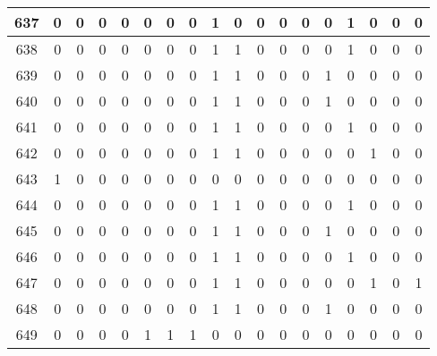 \begin{tabular}{|c|c|c|c|c|c|c|c|c|c|c|c|c|c|c|c|c|c|}
\midrule
637    &    0 &    0 &    0 &   0 &        0 &        0 &    0 &    1 &    0 &    0 &    0 &    0 &    0 &    1 &     0 &    0 &     0 \\
\midrule
638    &    0 &    0 &    0 &   0 &        0 &        0 &    0 &    1 &    1 &    0 &    0 &    0 &    0 &    1 &     0 &    0 &     0 \\
\midrule
639    &    0 &    0 &    0 &   0 &        0 &        0 &    0 &    1 &    1 &    0 &    0 &    0 &    1 &    0 &     0 &    0 &     0 \\
\midrule
640    &    0 &    0 &    0 &   0 &        0 &        0 &    0 &    1 &    1 &    0 &    0 &    0 &    1 &    0 &     0 &    0 &     0 \\
\midrule
641    &    0 &    0 &    0 &   0 &        0 &        0 &    0 &    1 &    1 &    0 &    0 &    0 &    0 &    1 &     0 &    0 &     0 \\
\midrule
642    &    0 &    0 &    0 &   0 &        0 &        0 &    0 &    1 &    1 &    0 &    0 &    0 &    0 &    0 &     1 &    0 &     0 \\
\midrule
643    &    1 &    0 &    0 &   0 &        0 &        0 &    0 &    0 &    0 &    0 &    0 &    0 &    0 &    0 &     0 &    0 &     0 \\
\midrule
644    &    0 &    0 &    0 &   0 &        0 &        0 &    0 &    1 &    1 &    0 &    0 &    0 &    0 &    1 &     0 &    0 &     0 \\
\midrule
645    &    0 &    0 &    0 &   0 &        0 &        0 &    0 &    1 &    1 &    0 &    0 &    0 &    1 &    0 &     0 &    0 &     0 \\
\midrule
646    &    0 &    0 &    0 &   0 &        0 &        0 &    0 &    1 &    1 &    0 &    0 &    0 &    0 &    1 &     0 &    0 &     0 \\
\midrule
647    &    0 &    0 &    0 &   0 &        0 &        0 &    0 &    1 &    1 &    0 &    0 &    0 &    0 &    0 &     1 &    0 &     1 \\
\midrule
648    &    0 &    0 &    0 &   0 &        0 &        0 &    0 &    1 &    1 &    0 &    0 &    0 &    1 &    0 &     0 &    0 &     0 \\
\midrule
649    &    0 &    0 &    0 &   0 &        1 &        1 &    1 &    0 &    0 &    0 &    0 &    0 &    0 &    0 &     0 &    0 &     0 \\\bottomrule\end{tabular}
